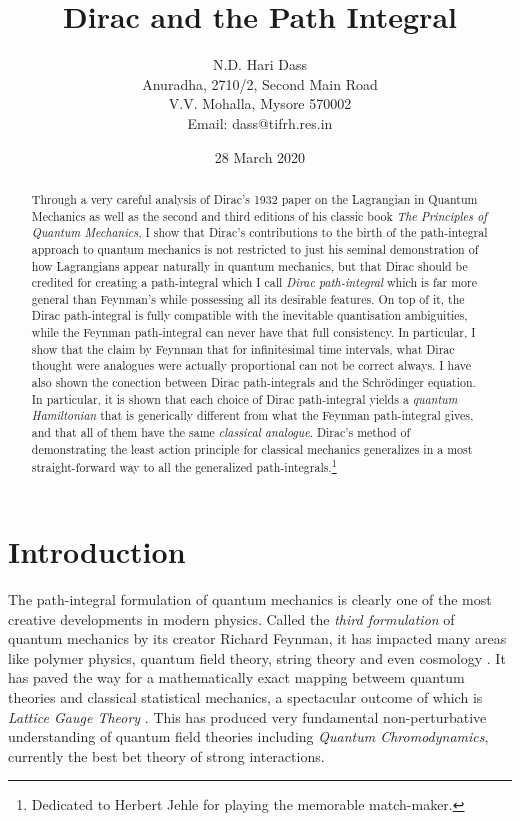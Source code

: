\documentclass[12pt]{article}
\begin{document}
\title{Dirac and the Path Integral}
\author{N.D. Hari Dass \\  
Anuradha, 2710/2, Second Main Road\\V.V. Mohalla, Mysore 570002\\
Email: {dass@tifrh.res.in}}

\date{28 March 2020}

\maketitle

\begin{abstract}
Through a very careful analysis of Dirac's 1932 paper on the Lagrangian in Quantum Mechanics as well as the second and third editions
of his classic book {\it The Principles of Quantum Mechanics}, I show that Dirac's contributions to the birth of the path-integral approach
to quantum mechanics is not restricted to just his seminal demonstration of how Lagrangians appear naturally in quantum mechanics, but that
Dirac should be credited for creating a path-integral  which I call {\it Dirac path-integral} which is far more general than Feynman's while
possessing all its desirable features. On top of it, the Dirac path-integral is fully compatible with the inevitable quantisation ambiguities, 
while the Feynman path-integral can never have that full consistency. In particular, I show that the claim by Feynman that for infinitesimal
time intervals, what Dirac thought were analogues were actually proportional can not be correct always. I have also shown the conection
between Dirac path-integrals and the Schr\"odinger equation. In particular, it is shown that each choice of Dirac path-integral yields a
{\it quantum Hamiltonian} that is generically different from what the Feynman path-integral gives, and that all of them have the same
{\it classical analogue}. Dirac's method of demonstrating the least action principle for classical
mechanics generalizes in a most straight-forward way to all the generalized path-integrals.\footnote {Dedicated to Herbert Jehle for playing 
the memorable match-maker.}
\end{abstract}


\newpage

\section{Introduction}
The path-integral formulation of quantum mechanics is clearly one of the most creative developments in modern physics. Called the 
{\it third formulation} of quantum mechanics by its creator Richard Feynman, it has impacted many areas like polymer physics, quantum field theory, string theory and even cosmology \cite{kleinert}. It has paved the way for a mathematically exact mapping betweem quantum theories and
classical statistical mechanics, a spectacular outcome of which is {\it Lattice Gauge Theory} \cite{seiler}. This has produced very fundamental non-perturbative understanding of quantum field theories including {\it Quantum Chromodynamics}, currently the best bet theory of strong interactions.
\end{document}
